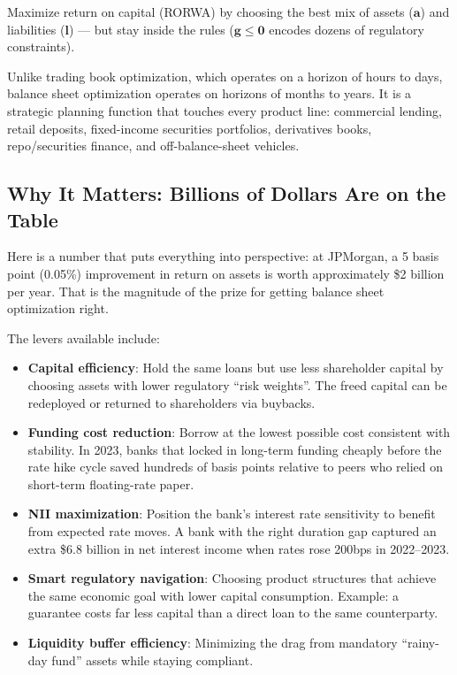 \documentclass[12pt,a4paper]{article}
\begin{document}
\begin{mdframed}[style=plainenglish]
Maximize return on capital (RORWA) by choosing the best mix of assets
($\mathbf{a}$) and liabilities ($\mathbf{l}$) --- but stay inside the rules
($\mathbf{g} \leq \mathbf{0}$ encodes dozens of regulatory constraints).
\end{mdframed}

Unlike trading book optimization, which operates on a horizon of hours to
days, balance sheet optimization operates on horizons of months to years.
It is a strategic planning function that touches every product line:
commercial lending, retail deposits, fixed-income securities portfolios,
derivatives books, repo/securities finance, and off-balance-sheet vehicles.

\subsection{Why It Matters: Billions of Dollars Are on the Table}

Here is a number that puts everything into perspective: at JPMorgan, a
5 basis point (0.05\%) improvement in return on assets is worth approximately
\$2 billion per year.  That is the magnitude of the prize for getting balance
sheet optimization right.

The levers available include:

\begin{itemize}[noitemsep]
  \item \textbf{Capital efficiency}: Hold the same loans but use less
        shareholder capital by choosing assets with lower regulatory ``risk
        weights''.  The freed capital can be redeployed or returned to
        shareholders via buybacks.
  \item \textbf{Funding cost reduction}: Borrow at the lowest possible cost
        consistent with stability.  In 2023, banks that locked in long-term
        funding cheaply before the rate hike cycle saved hundreds of basis
        points relative to peers who relied on short-term floating-rate paper.
  \item \textbf{NII maximization}: Position the bank's interest rate
        sensitivity to benefit from expected rate moves.  A bank with the
        right duration gap captured an extra \$6.8 billion in net interest
        income when rates rose 200bps in 2022--2023.
  \item \textbf{Smart regulatory navigation}: Choosing product structures
        that achieve the same economic goal with lower capital consumption.
        Example: a guarantee costs far less capital than a direct loan to the
        same counterparty.
  \item \textbf{Liquidity buffer efficiency}: Minimizing the drag from
        mandatory ``rainy-day fund'' assets while staying compliant.
\end{itemize}
\end{document}
